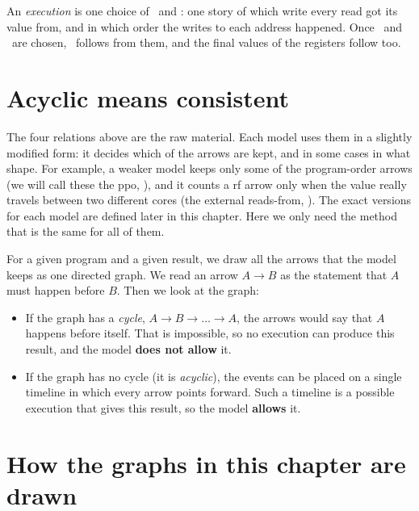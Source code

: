 An \emph{execution} is one choice of \rf\ and \co: one story of which write every read got its value from, and in which order the writes to each address happened. Once \rf\ and \co\ are chosen, \fr\ follows from them, and the final values of the registers follow too.

\section{Acyclic means consistent}
\label{sec:acyclic}

The four relations above are the raw material. Each model uses them in a slightly modified form: it decides which of the arrows are kept, and in some cases in what shape. For example, a weaker model keeps only some of the program-order arrows (we will call these the \gls{ppo}, \ppo), and it counts a \gls{rf} arrow only when the value really travels between two different cores (the external reads-from, \rfe). The exact versions for each model are defined later in this chapter. Here we only need the method that is the same for all of them.

For a given program and a given result, we draw all the arrows that the model keeps as one directed graph. We read an arrow $A \to B$ as the statement that $A$ must happen before $B$. Then we look at the graph:
\begin{itemize}
  \item If the graph has a \emph{cycle}, $A \to B \to \dots \to A$, the arrows would say that $A$ happens before itself. That is impossible, so no execution can produce this result, and the model \textbf{does not allow} it.
  \item If the graph has no cycle (it is \emph{acyclic}), the events can be placed on a single timeline in which every arrow points forward. Such a timeline is a possible execution that gives this result, so the model \textbf{allows} it.
\end{itemize}

\section{How the graphs in this chapter are drawn}
\label{sec:legend}


